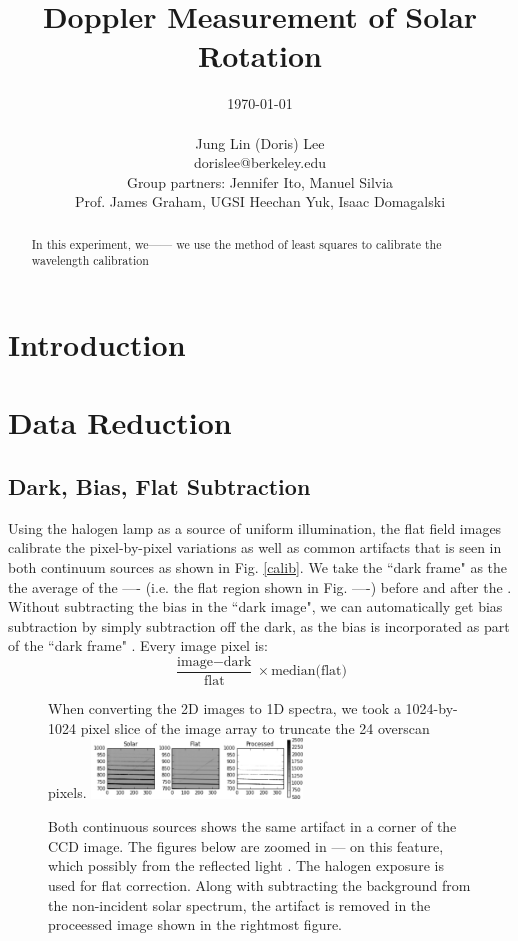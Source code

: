 \documentclass[authoryear, 12pt,5p, times]{elsarticle}
\begin{document}
\begin{frontmatter}
\title{Doppler Measurement of Solar Rotation}
\author{\today \\ \quad \\Jung Lin (Doris) Lee\\ dorislee@berkeley.edu\\Group partners: Jennifer Ito, Manuel Silvia\\Prof. James Graham, UGSI Heechan Yuk, Isaac Domagalski}
	\begin{abstract}
In this experiment,  we------
we use the method of least squares to calibrate the wavelength calibration 
	\end{abstract}
\end{frontmatter}
\section{Introduction}
\section{Data Reduction}
\subsection{Dark, Bias, Flat Subtraction}
\label{subtraction}
Using the halogen lamp as a source of uniform illumination, the flat field images calibrate the pixel-by-pixel variations as well as common artifacts that is seen in both continuum sources as shown in Fig. \ref{calib}. We take the ``dark frame" as the the average of the ---- (i.e. the flat region shown in Fig. ----) before and after the  . Without subtracting the bias in the ``dark image", we can automatically get bias subtraction by simply subtraction off the dark, as the bias is incorporated as part of the ``dark frame" .
Every image pixel is:
\begin{equation}
			\frac{\text{image}-\text{dark}}{\text{flat}}\times\text{median(flat)}
			\label{calib_eq}
\end{equation}
 \begin{figure}[h!]
 When converting the 2D images to 1D spectra, we took a 1024-by-1024 pixel slice of the image array to truncate the 24 overscan pixels.
\includegraphics[width=0.5\textwidth]{figures/processed}
\caption{Both continuous sources shows the same artifact in a corner of the CCD image. The figures below are zoomed in --- on this feature, which  possibly from the reflected light . The halogen exposure is used for flat correction. Along with subtracting the background from the non-incident solar spectrum, the artifact is removed in the proceessed image shown in the rightmost figure.}
\label{processed}
\end{figure}
\end{document}
